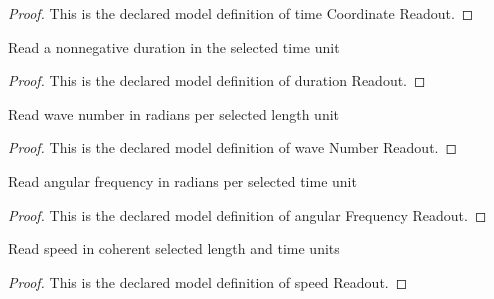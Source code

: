 \begin{proof}
  This is the declared model definition of time Coordinate Readout.
\end{proof}
\begin{definition}
  \label{def:physics:phyx-mini-0297:phyxminiproblems-problemphyxmini0297-durationreadout}
  Read a nonnegative duration in the selected time unit
\end{definition}
\begin{proof}
  This is the declared model definition of duration Readout.
\end{proof}
\begin{definition}
  \label{def:physics:phyx-mini-0297:phyxminiproblems-problemphyxmini0297-wavenumberreadout}
  Read wave number in radians per selected length unit
\end{definition}
\begin{proof}
  This is the declared model definition of wave Number Readout.
\end{proof}
\begin{definition}
  \label{def:physics:phyx-mini-0297:phyxminiproblems-problemphyxmini0297-angularfrequencyreadout}
  Read angular frequency in radians per selected time unit
\end{definition}
\begin{proof}
  This is the declared model definition of angular Frequency Readout.
\end{proof}
\begin{definition}
  \label{def:physics:phyx-mini-0297:phyxminiproblems-problemphyxmini0297-speedreadout}
  Read speed in coherent selected length and time units
\end{definition}
\begin{proof}
  This is the declared model definition of speed Readout.
\end{proof}
